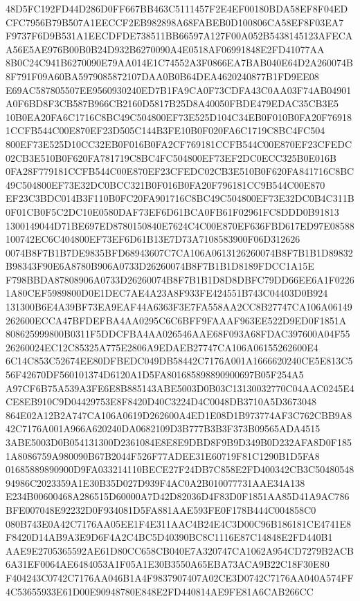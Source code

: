 \documentclass[UTF8,fontset=fandol,zihao=-4,a4paper]{ctexart}
\begin{document}
{{48D5FC192FD44D286D0FF667BB463C5111457F2E4EF00180BDA58EF8F04EDCFC7956B79B507A1EECCF2EB982898A68FABEB0D100806CA58EF8F03EA7
F9737F6D9B531A1EECDFDE738511BB66597A127F00A052B5438145123AFECAA56E5AE976B00B0B24D932B6270090A4E0518AF06991848E2FD41077AA
8B0C24C941B6270090E79AA014E1C74552A3F0866EA7BAB040E64D2A260074B8F791F09A60BA5979085872107DAA0B0B64DEA4620240877B1FD9EE08
E69AC587805507EE9560930240ED7B1FA9CA0F73CDFA43C0AA03F74AB04901A0F6BD8F3CB587B966CB2160D5817B25D8A40050FBDE479EDAC35CB3E5
10B0EA20FA6C1716C8BC49C504800EF73E525D104C34EB0F010B0FA20F769181CCFB544C00E870EF23D505C144B3FE10B0F020FA6C1719C8BC4FC504
800EF73E525D10CC32EB0F016B0FA2CF769181CCFB544C00E870EF23CFEDC02CB3E510B0F620FA781719C8BC4FC504800EF73EF2DC0ECC325B0E016B
0FA28F779181CCFB544C00E870EF23CFEDC02CB3E510B0F620FA841716C8BC49C504800EF73E32DC0BCC321B0F016B0FA20F796181CC9B544C00E870
EF23C3BDC014B3F110B0FC20FA901716C8BC49C504800EF73E32DC0B4C311B0F01CB0F5C2DC10E0580DAF73EF6D61BCA0FB61F02961FC8DDD0B91813
1300149044D71BE697ED8780150840E7624C4C00E870EF636FBD617ED97E08588100742EC6C404800EF73EF6D61B13E7D73A7108583900F06D312626
0074B8F7B1B7DE9835BFD68943607C7CA106A0613126260074B8F7B1B1D89832B98343F90E6A8780B906A0733D26260074B8F7B1B1D8189FDCC1A15E
F798BBDA87808906A0733D26260074B8F7B1B1D8D8DBFC79DD66EE6A1F02261A80CEF5989800D0E1DEC7AE4A23A8F933FE424551B743C04403D0B924
131300B6E4A39BF73EA9EAF44A6363F3E7FA558AA2CC8B27747CA106A06149262600ECCA47BFDEFBA4AA0295C6C6BFF9FAAAF963EE522D9ED0F1851A
808625999800B0311F5DDCFBA4AA026546AAE68F093A68FDAC397600A04F5526260024EC12C85325A775E2806A9EDAEB27747CA106A06155262600E4
6C14C853C52674EE80DFBEDC049DB58442C7176A001A1666620240CE5E813C556F42670DF560101374D6120A1D5FA801685898890900697B05F254A5
A97CF6B75A539A3FE6E8B885143ABE5003D0B03C13130032770C04AAC0245E4CE8EB910C9D04429753E8F8420D40C3224D4C0048DB3710A5D3673048
864E02A12B2A747CA106A0619D262600A4ED1E08D1B973774AF3C762CBB9A842C7176A001A966A620240DA0682109D3B777B3B3F373B09565ADA4515
3ABE5003D0B054131300D2361084E8E8E9DBD8F9B9D349B0D232AFA8D0F1851A8086759A980090B67B2044F526F77ADEE31E60719F81C1290B1D5FA8
01685889890900D9FA033214110BECE27F24DB7C858E2FD400342CB3C5048054894986C2023359A1E30B35D027D939F4AC0A2B010077731AAE34A138
E234B00600468A286515D60000A7D42D82036D4F83D0F1851AA85D41A9AC786BFE007048E92232D0F934081D5FA881AAE593FE0F178B444C004858C0
080B743E0A42C7176AA05EE1F4E311AAC4B24E4C3D00C96B186181CE4741E8F8420D14AB9A3E9D6F4A2C4BC5D40390BC8C1116E87C14848E2FD440B1
AAE9E2705365592AE61D80CC658CB040E7A320747CA1062A954CD7279B2ACB6A31EF0064AE6484053A1F05A1E30B3550A65EBA73ACA9B22C18F30E80
F404243C0742C7176AA046B1A4F9837907407A02CE3D0742C7176AA040A574FF4C53655933E61D00E90948780E848E2FD440814AE9FE81A6CAB266CC
}}
\end{document}
